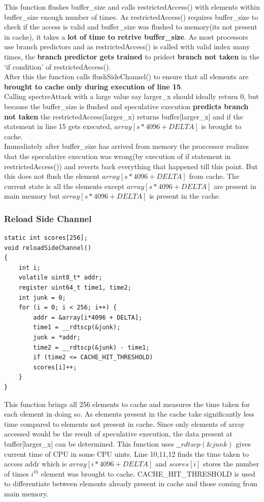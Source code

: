 \documentclass[12pt]{article}
\begin{document}
This function flushes buffer\_size and calls restrictedAccess() with elements within buffer\_size enough number of times. As restrictedAccess() requires buffer\_size to check if the access is valid and buffer\_size was flushed to memory(its not present in cache), it takes a \textbf{lot of time to retrive buffer\_size}. As most processors use branch predictors and as restrictedAccess() is called with valid index many times, the \textbf{branch predictor gets trained} to pridect \textbf{branch not taken} in the `if condition' of restrictedAccess().\\
After this the function calls flushSideChannel() to ensure that all elements are \textbf{brought to cache only during execution of line 15}.\\
Calling spectreAttack with a large value say larger\_x should ideally return 0, but because the buffer\_size is flushed and speculative execution \textbf{predicts branch not taken} the restrictedAccess(larger\_x) returns buffer[larger\_x] and if the statement in line 15 gets executed, $array[s*4096+DELTA]$ is brought to cache.\\
Immediately after buffer\_size has arrived from memory the proccessor realizes that the speculative execution was wrong(by execution of if statement in restrictedAccess()) and reverts back everything that happened till this point.
But this does not flush the element $array[s*4096+DELTA]$ from cache. 
The current state is all the elements except $array[s*4096+DELTA]$ are present in main memory but $array[s*4096+DELTA]$ is present in the cache.   
 
   
\subsubsection{Reload Side Channel}
\begin{lstlisting}[style=CStyle]
static int scores[256];
void reloadSideChannel()
{
	int i;
	volatile uint8_t* addr;
	register uint64_t time1, time2;
	int junk = 0;
	for (i = 0; i < 256; i++) {
		addr = &array[i*4096 + DELTA];
		time1 = __rdtscp(&junk);
		junk = *addr;
		time2 = __rdtscp(&junk) - time1;
		if (time2 <= CACHE_HIT_THRESHOLD)
		scores[i]++; 
	}
}
\end{lstlisting}

This function brings all 256 elements to cache and measures the time taken for each element in doing so. As elements present in the cache take significantly less time compared to elements not present in cache. Since only elements of array accessed would be the result of speculative execution, the data present at buffer[larger\_x] can be determined.
This function uses $\_\_rdtscp (\&junk)$ gives current time of CPU in some CPU uints.
Line 10,11,12 finds the time taken to access addr which is $array[i*4096+DELTA]$ and
$scores[i]$ stores the number of times $i^{th}$ element was brought to cache.
CACHE\_HIT\_THRESHOLD is used to differentiate between elements already present in cache and those coming from main memory.
\end{document}
